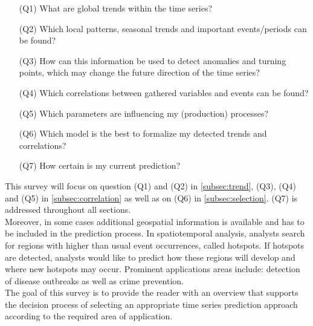 \documentclass[electronic]{vgtc}             %
\begin{document}
\begin{enumerate}
	\itemsep0em 
	\item[(Q1)] What are global trends within the time series?
	\item[(Q2)] Which local patterns, seasonal trends and important events/periods can be found?
	\item[(Q3)] How can this information be used to detect anomalies and turning points, which may change the future direction of the time series?
	\item[(Q4)] Which correlations between gathered variables and events can be found?
	\item[(Q5)] Which parameters are influencing my (production) processes?
	\item[(Q6)] Which model is the best to formalize my detected trends and correlations?
	\item[(Q7)] How certain is my current prediction? 
\end{enumerate}
This survey will focus on question (Q1) and (Q2) in \autoref{subsec:trend}, (Q3), (Q4) and (Q5) in \autoref{subsec:correlation} as well as on (Q6) in \autoref{subsec:selection}.
(Q7) is addressed throughout all sections.\\
Moreover, in some cases additional geospatial information is available and has to be included in the prediction process. 
In spatiotemporal analysis, analysts search for regions with higher than usual event occurrences, called hotspots.
If hotspots are detected, analysts would like to predict how these regions will develop and where new hotspots may occur.
Prominent applications areas include: detection of disease outbreaks as well as crime prevention. \\
The goal of this survey is to provide the reader with an overview that supports  the decision process of selecting an appropriate time series prediction approach according to the required area of application.
\end{document}
